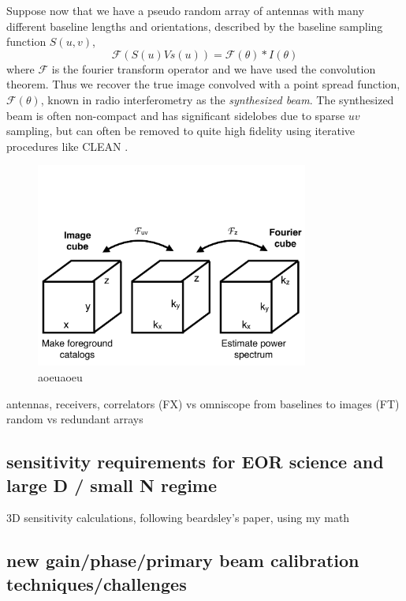 Suppose now that we have a pseudo random array of antennas with many different baseline lengths and orientations, described by the baseline sampling function $S(u,v)$, 
\begin{equation}
	 \mathcal{F}(S(u)Vs(u))=\mathcal{F}(\theta)\ast I(\theta)
\end{equation}
where $\mathcal{F}$ is the fourier transform operator and we have used the convolution theorem. Thus we recover the true image convolved with a point spread function, $\mathcal{F}(\theta)$, known in radio interferometry as the \textit{synthesized beam}. The synthesized beam is often non-compact and has significant sidelobes due to sparse $uv$ sampling, but can often be removed to quite high fidelity using iterative procedures like CLEAN \citep{hogbomclean}.

\begin{figure}[h]
    \centering
    \includegraphics[width=0.8\textwidth]{chap0_intro/ifo_space.pdf}
    \caption[Representation of the relation between image space, fourier space, and interferometer space]{aoeuaoeu}
    \label{fig:ifospace}
\end{figure}




antennas, receivers, correlators (FX) vs omniscope
from baselines to images (FT)
random vs redundant arrays

\subsection{sensitivity requirements for EOR science and large D / small N regime}

3D sensitivity calculations, following beardsley's paper, using my math

\subsection{new gain/phase/primary beam calibration techniques/challenges}


